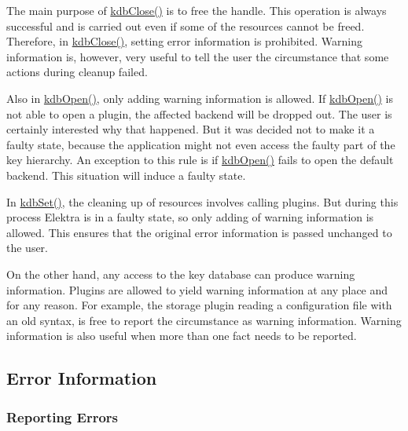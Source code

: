 \begin{DoxyItemize}
\item The main purpose of {\ttfamily \hyperlink{group__kdb_gadb54dc9fda17ee07deb9444df745c96f}{kdb\+Close()}} is to free the handle. This operation is always successful and is carried out even if some of the resources cannot be freed. Therefore, in {\ttfamily \hyperlink{group__kdb_gadb54dc9fda17ee07deb9444df745c96f}{kdb\+Close()}}, setting error information is prohibited. Warning information is, however, very useful to tell the user the circumstance that some actions during cleanup failed.
\item Also in {\ttfamily \hyperlink{group__kdb_ga6808defe5870f328dd17910aacbdc6ca}{kdb\+Open()}}, only adding warning information is allowed. If {\ttfamily \hyperlink{group__kdb_ga6808defe5870f328dd17910aacbdc6ca}{kdb\+Open()}} is not able to open a plugin, the affected backend will be dropped out. The user is certainly interested why that happened. But it was decided not to make it a faulty state, because the application might not even access the faulty part of the key hierarchy. An exception to this rule is if {\ttfamily \hyperlink{group__kdb_ga6808defe5870f328dd17910aacbdc6ca}{kdb\+Open()}} fails to open the default backend. This situation will induce a faulty state.
\item In {\ttfamily \hyperlink{group__kdb_ga11436b058408f83d303ca5e996832bcf}{kdb\+Set()}}, the cleaning up of resources involves calling plugins. But during this process Elektra is in a faulty state, so only adding of warning information is allowed. This ensures that the original error information is passed unchanged to the user.
\end{DoxyItemize}

On the other hand, any access to the key database can produce warning information. Plugins are allowed to yield warning information at any place and for any reason. For example, the storage plugin reading a configuration file with an old syntax, is free to report the circumstance as warning information. Warning information is also useful when more than one fact needs to be reported.

\subsection*{Error Information}

\subsubsection*{Reporting Errors}

